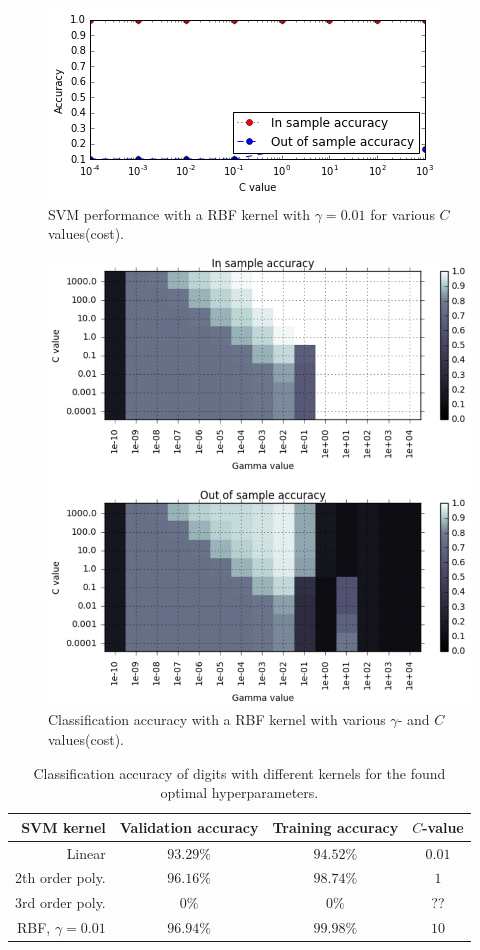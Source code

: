 \documentclass[a4paper,10pt,article,oneside,english]{memoir}
\begin{document}
\begin{figure}[h!]
	\centering
	\includegraphics[width=0.7\linewidth]{svm_rbf.PNG}
	\caption{SVM performance with a RBF kernel with $\gamma=0.01$ for various $C$ values(cost).}
	\label{fig:svm_rbf}
\end{figure}

\begin{figure}[h!]
	\centering
	\includegraphics[width=0.9\linewidth]{svm_rbf_grid.PNG}
	\caption{Classification accuracy with a RBF kernel with various $\gamma$- and $C$ values(cost).}
	\label{fig:svm_rbf_grid}
\end{figure}

\begin{table}[h!]
	\centering
	\caption{Classification accuracy of digits with different kernels for the found optimal hyperparameters. }
	\label{tab:svm_accuracy}
	\begin{tabular}{rccc}
		SVM kernel & Validation accuracy & Training accuracy & $C$-value \\ 
		\hline 
		Linear & $93.29\%$ & $94.52\%$ & $0.01$ \\ 
		2th order poly. & $96.16\%$ & $98.74\%$ & $1$ \\ 
		3rd order poly. & $0\%$ & $0\%$ & ?? \\ 
		RBF, $\gamma=0.01$ & $96.94\%$ & $99.98\%$ & $10$ \\ 
	\end{tabular} 
\end{table}
\end{document}
